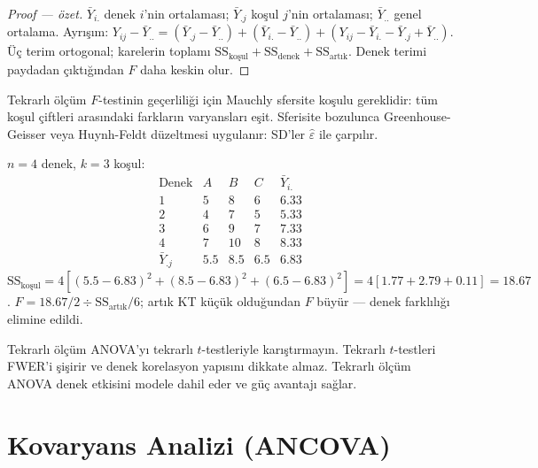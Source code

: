 \begin{proof}[Proof --- özet]
$\bar Y_{i.}$ denek $i$'nin ortalaması; $\bar Y_{.j}$ koşul $j$'nin ortalaması; $\bar Y_{..}$ genel ortalama. Ayrışım: $Y_{ij}-\bar Y_{..} = (\bar Y_{.j}-\bar Y_{..}) + (\bar Y_{i.}-\bar Y_{..}) + (Y_{ij}-\bar Y_{i.}-\bar Y_{.j}+\bar Y_{..})$. Üç terim ortogonal; karelerin toplamı $\mathrm{SS}_{\text{koşul}}+\mathrm{SS}_{\text{denek}}+\mathrm{SS}_{\text{artık}}$. Denek terimi paydadan çıktığından $F$ daha keskin olur.
\end{proof}

\begin{teorem}\label{thm:sferisite}
Tekrarlı ölçüm $F$-testinin geçerliliği için Mauchly sfersite koşulu gereklidir: tüm koşul çiftleri arasındaki farkların varyansları eşit. Sferisite bozulunca Greenhouse-Geisser veya Huynh-Feldt düzeltmesi uygulanır: SD'ler $\hat\varepsilon$ ile çarpılır.
\end{teorem}

\begin{ornek}
$n=4$ denek, $k=3$ koşul:
\[
\begin{array}{c|ccc|c}
\text{Denek} & A & B & C & \bar{Y}_{i.} \\ \hline
1 & 5 & 8 & 6 & 6.33 \\
2 & 4 & 7 & 5 & 5.33 \\
3 & 6 & 9 & 7 & 7.33 \\
4 & 7 & 10 & 8 & 8.33 \\ \hline
\bar{Y}_{.j} & 5.5 & 8.5 & 6.5 & 6.83
\end{array}
\]
$\mathrm{SS}_{\text{koşul}}=4[(5.5-6.83)^2+(8.5-6.83)^2+(6.5-6.83)^2]=4[1.77+2.79+0.11]=18.67$.
$F=18.67/2\div\mathrm{SS}_{\text{artık}}/6$; artık KT küçük olduğundan $F$ büyür --- denek farklılığı elimine edildi.
\end{ornek}

\begin{hataanalizi}
Tekrarlı ölçüm ANOVA'yı tekrarlı $t$-testleriyle karıştırmayın. Tekrarlı $t$-testleri FWER'i şişirir ve denek korelasyon yapısını dikkate almaz. Tekrarlı ölçüm ANOVA denek etkisini modele dahil eder ve güç avantajı sağlar.
\end{hataanalizi}

\section{Kovaryans Analizi (ANCOVA)}
\label{sec:ancova}

